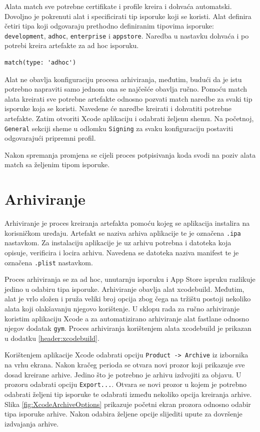 \documentclass[times, utf8, diplomski, numeric]{fer}
\begin{document}
Alata match sve potrebne certifikate i profile kreira i dohvaća automatski. Dovoljno je pokrenuti alat i specificirati tip isporuke koji se koristi. Alat definira četiri tipa koji odgovaraju prethodno definiranim tipovima isporuke: \verb|development|, \verb|adhoc|, \verb|enterprise| i \verb|appstore|. Naredba u nastavku dohvaća i po potrebi kreira artefakte za ad hoc isporuku.

\begin{lstlisting}[caption=Dohvćanje artefakta pomoću dodatka match za ad hoc isporuku]
match(type: 'adhoc')
\end{lstlisting}

Alat ne obavlja konfiguraciju procesa arhiviranja, međutim, budući da je istu potrebno napraviti samo jednom ona se najčešće obavlja ručno. Pomoću match alata kreirati sve potrebne artefakte odnosno pozvati match naredbe za svaki tip isporuke koja se koristi. Navedene će naredbe kreirati i dohvatiti potrebne artefakte. Zatim otvoriti Xcode aplikaciju i odabrati željenu shemu. Na početnoj, \verb|General| sekciji sheme u odlomku \verb|Signing| za svaku konfiguraciju postaviti odgovarajući pripremni profil.

Nakon spremanja promjena se cijeli proces potpisivanja koda svodi na poziv alata match sa željenim tipom isporuke.


\section{Arhiviranje} \label{header:RucnaIsporuka}

Arhiviranje je proces kreiranja artefakta pomoću kojeg se aplikacija instalira na korisničkom uređaju. Artefakt se naziva arhiva aplikacije te je označena \verb|.ipa| nastavkom. Za instalaciju aplikacije je uz arhivu potrebna i datoteka koja opisuje, verificira i locira arhivu. Navedena se datoteka naziva manifest te je označena \verb|.plist| nastavkom.

Proces arhiviranja se za ad hoc, unutarnju isporuku i App Store ispruku razlikuje jedino u odabiru tipa isporuke. Arhiviranje obavlja alat xcodebuild. Međutim, alat je vrlo složen i pruža veliki broj opcija zbog čega na tržištu postoji nekoliko alata koji olakšavanju njegovo korištenje. U sklopu rada za ručno arhiviranje koristim aplikaciju Xcode a za automatizirano arhiviranje alat fastlane odnosno njegov dodatak \verb|gym|. Proces arhiviranja korištenjem alata xcodebuild je prikazan u dodatku \ref{header:xcodebuild}.

Korištenjem aplikacije Xcode odabrati opciju \verb|Product -> Archive| iz izbornika na vrhu ekrana. Nakon kračeg perioda se otvara novi prozor koji prikazuje sve dosad kreirane arhive. Jedino što je potrebno je arhivu izdvojiti za objavu. U prozoru odabrati opciju \verb|Export...|. Otvara se novi prozor u kojem je potrebno odabrati željeni tip isporuke te odabrati između nekoliko opcija kreiranja arhive. Slika \ref{fig:XcodeArchiveOptions} prikazuje početni ekran prozora odnosno odabir tipa isporuke arhive. Nakon odabira željene opcije slijediti upute za dovršenje izdvajanja arhive.
\end{document}
